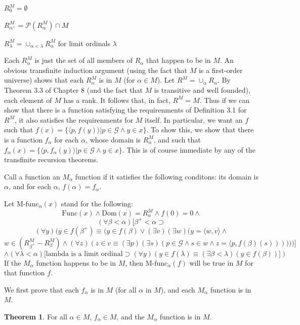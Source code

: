 \documentclass{article}
\theoremstyle{definition}
\newtheorem{theorem}{Theorem}[section]
\begin{document}
$R^M_0=\emptyset$

$R^M_{\alpha^+}=\mathcal{P}(R^M_\alpha)\cap M$

$R^M_\lambda=\cup_{\alpha<\lambda}R^M_\alpha$ for limit ordinals $\lambda$

Each $R^M_\alpha$ is just the set of all members of $R_\alpha$ that happen to be in $M$.
An obvious transfinite induction argument (using the fact that $M$ is a first-order universe) shows that 
each $R^M_\alpha$ is in $M$ (for $\alpha\in M$). Let $R^M=\cup_\alpha R_\alpha$. By Theorem 3.3 of Chapter 8 (and the fact 
that $M$ is transitive and well founded), each element of $M$ has a rank. It follows 
that, in fact, $R^M=M$. Thus if we can show that there is a function satisfying the requirenments of Definition 3.1 
for $R^M$, it also satisfies the requirenments for $M$ itself. In particular, we want an $f$ such that 
$f(x)=\{\langle p,f(y)\rangle|p\in\mathcal{G}\wedge y\in x\}$. To show this, we show that there is a function 
$f_\alpha$ for each $\alpha$, whose domain is $R^M_\alpha$, and such that 
$f_\alpha(x)=\{\langle p,f_\alpha(y)\rangle|p\in\mathcal{G}\wedge y\in x\}$. This is of course immediate by 
any of the transfinite recursion theorems.

Call a function an $M_\alpha$ function if it satisfies the following conditons: its domain is 
$\alpha$, and for each $\alpha$, $f(\alpha)=f_\alpha$.

Let $\textrm{M-func}_\alpha(x)$ stand for the following:
\[ \textrm{Func}(x)\wedge\textrm{Dom}(x)=R^M_\alpha\wedge f(0)=0\wedge \]
\[ (\forall\beta<\alpha)[\beta^+<\alpha\supset \]
\[ (\forall y)(y\in f(\beta^+)\equiv(y\in f(\beta)\vee(\exists v)(\exists w)(y=\langle w,v\rangle\wedge \]
\[ w\in(R^M_{\beta^+}-R^M_\beta)\wedge(\forall z)(z\in v\equiv(\exists p)(\exists s)(p\in\mathcal{G}\wedge s\in w\wedge z=\langle p,f(\beta)(s))))))] \]
\[ \wedge(\forall\lambda<\alpha)[\textrm{lambda is a limit ordinal}\supset(\forall y)(y\in f(\lambda)\equiv(\exists\beta<\lambda)(y\in f(\beta))]) \]
If the $M_\alpha$ function happens to be in $M$, then $\textrm{M-func}_\alpha(f)$ will be true in $M$ for that function $f$. 

We first prove that each $f_\alpha$ is in $M$ (for all $\alpha$ in $M$), and each $M_\alpha$ function is in $M$.

\begin{theorem}
For all $\alpha\in M$, $f_\alpha\in M$, and the $M_\alpha$ function is in $M$.
\end{theorem}
\end{document}

